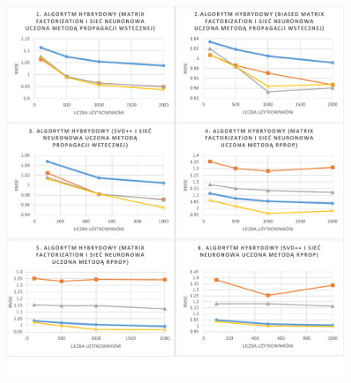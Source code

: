 \documentclass[twoside]{iisthesis}
\begin{document}
\begin{figure}[!ht]
	\centering
	\includegraphics[page=1,width=1\textwidth]{exphybrid_movielens2}
	\label{fig:exphybrid_movielens2a}
\end{figure}
\end{document}
